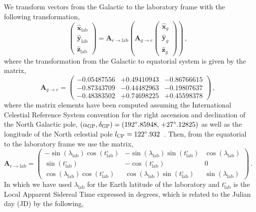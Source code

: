 We transform vectors from the Galactic to the laboratory frame with the following transformation,
\begin{equation}
 \begin{pmatrix}\hat{\textbf{x}}_\textrm{lab}\\\hat{\textbf{y}}_\textrm{lab}\\\hat{\textbf{z}}_\textrm{lab}\end{pmatrix} = \textbf{A}_{e\rightarrow\textrm{lab}}\left(\textbf{A}_{g\rightarrow e} \begin{pmatrix}\hat{\textbf{x}}_g\\\hat{\textbf{y}}_g\\\hat{\textbf{z}}_g\end{pmatrix} \right) \, ,
\end{equation}
where the transformation from the Galactic to equatorial system is given by the matrix,
\begin{equation}
 \textbf{A}_{g\rightarrow e} =
\begin{pmatrix}
-0.05487556 & +0.49410943 & -0.86766615 \\
-0.87343709 & -0.44482963 & -0.19807637 \\
-0.48383502 & +0.74698225 & +0.45598378
\end{pmatrix}  \, ,
\end{equation}
where the matrix elements have been computed assuming the International Celestial Reference System convention for the right ascension and declination of the North Galactic pole, $(\alpha_{\rm GP},\delta_{\rm GP}) = (192^\circ.85948,\,+27^\circ.12825)$ as well as the longitude of the North celestial pole $l_{\rm CP} = 122^\circ.932$~\cite{BinneyGalacticAstronomy}. Then, from the equatorial to the laboratory frame we use the matrix,
\begin{equation}\label{eq:eqt2lab}
 \textbf{A}_{e\rightarrow \textrm{lab}}  = 
\begin{pmatrix}
 -\sin(\lambda_\textrm{lab})\cos(t^\circ_\textrm{lab}) & -\sin(\lambda_\textrm{lab})\sin(t^\circ_\textrm{lab}) & \cos(\lambda_\textrm{lab}) \\
 \sin(t^\circ_\textrm{lab}) & -\cos(t^\circ_\textrm{lab}) & 0\\
 \cos(\lambda_\textrm{lab})\cos(t^\circ_\textrm{lab}) & \cos(\lambda_\textrm{lab})\sin(t^\circ_\textrm{lab}) & \sin(\lambda_\textrm{lab})
\end{pmatrix} \, .
\end{equation}
In which we have used $\lambda_\textrm{lab}$ for the Earth latitude of the laboratory and $t^\circ_\textrm{lab}$ is the Local Apparent Sidereal Time expressed in degrees, which is related to the Julian day (JD) by the following,
